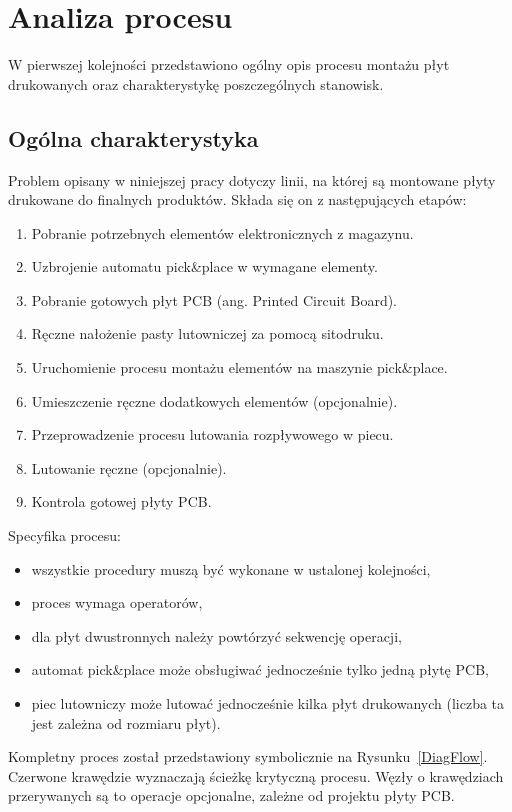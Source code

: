 \chapter{Analiza procesu}

W pierwszej kolejności przedstawiono ogólny opis procesu montażu płyt drukowanych oraz charakterystykę poszczególnych stanowisk.

\section{Ogólna charakterystyka}
Problem opisany w  niniejszej pracy dotyczy linii, na której są montowane płyty drukowane do finalnych produktów.
Składa się on z następujących etapów:
\begin{enumerate}
	\item Pobranie potrzebnych elementów elektronicznych z magazynu.
	\item Uzbrojenie automatu pick\&place w wymagane elementy.
	\item Pobranie gotowych płyt PCB (ang. Printed Circuit Board).
	\item Ręczne nałożenie pasty lutowniczej za pomocą sitodruku.
	\item Uruchomienie procesu montażu elementów na maszynie pick\&place.
	\item Umieszczenie ręczne dodatkowych elementów (opcjonalnie).
	\item Przeprowadzenie procesu lutowania rozpływowego w piecu.
	\item Lutowanie ręczne (opcjonalnie).
	\item Kontrola gotowej płyty PCB\@.
\end{enumerate}

\breakparagraph{}
Specyfika procesu:
\begin{itemize}
	\item wszystkie procedury muszą być wykonane w ustalonej kolejności,
	\item proces wymaga operatorów,
	\item dla płyt dwustronnych należy powtórzyć sekwencję operacji,
	\item automat pick\&place może obsługiwać jednocześnie tylko jedną płytę PCB,
	\item piec lutowniczy może lutować jednocześnie kilka płyt drukowanych (liczba ta jest zależna od rozmiaru płyt).
\end{itemize}

Kompletny proces został przedstawiony symbolicznie na Rysunku~\ref{DiagFlow}.
Czerwone krawędzie wyznaczają ścieżkę krytyczną procesu.
Węzły o krawędziach przerywanych są to operacje opcjonalne, zależne od projektu płyty PCB\@.

